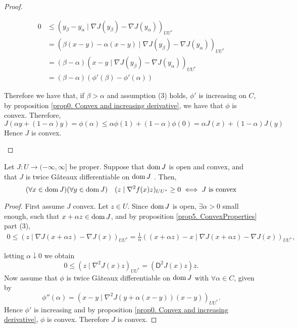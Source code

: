 \begin{proposition}
\begin{proof}
\begin{itemize}
		 \begin{align*}
		 0 &\leq (y_\beta - y_\alpha \mid \nabla J(y_\beta)-\nabla J(y_\alpha))_{UU^*}\\
		   &=(\beta (x-y) - \alpha(x-y) \mid \nabla J(y_\beta)-\nabla J(y_\alpha))_{UU^*} \\
	 	   &=(\beta-\alpha) (x-y \mid \nabla J(y_\beta)-\nabla J(y_\alpha))_{UU^*} \\
	 	   &= (\beta-\alpha) \left(\phi'(\beta)-\phi'(\alpha)\right)
		 \end{align*} 
		 
		 Therefore we have that, if $\beta > \alpha$ and assumption (3) holds, $\phi'$ is increasing on $C$, by proposition \eqref{prop0. Convex and increasing derivative}, we have that $\phi$ is convex. Therefore,
		 \[
		 J(\alpha y+(1-\alpha)y)=\phi(\alpha) \leq \alpha \phi(1)+(1-\alpha)\phi(0)=\alpha J(x) +(1-\alpha)J(y)
		 \]
		 Hence $J$ is convex.
		\end{itemize}
	 \end{proof}
\label{prop5. First derivative convex.}
\end{proposition}

\begin{theorem}
	\label{th5. Secon derivative convex.}
	 Let $J: U \rightarrow (-\infty, \infty]$ be proper. Suppose that $\mathrm{dom\,} J$
	 is open and convex, and that $J$ is twice G\^ateaux differentiable on $\mathrm{dom\,} J$ . Then,
	 \[
		 (\forall x \in \mathrm{dom\,} J )(\forall y \in \mathrm{dom\,} J ) \quad (z\mid  \nabla^2 f(x)z)_{UU^*} \geq 0 \iff J \text{ is convex}
	 \]
	 \begin{proof}
	 	First assume $J$ convex. Let $z \in U$. Since $\mathrm{dom\,} J$ is open, $\exists \alpha >0$ small enough, such that $x+\alpha z \in \mathrm{dom\,} J$, and by proposition \eqref{prop5. ConvexProperties} part (3), 
	 	\begin{align*}
	 		0 \leq	(z \mid \nabla J(x+\alpha z)-\nabla J(x))_{UU^*} = \frac{1}{\alpha} ((x+\alpha z) -x \mid \nabla J(x+\alpha z)-\nabla J(x))_{UU^*},
	 	\end{align*}
	 	
	 	letting $\alpha \downarrow 0$ we obtain
	 	\[
	 	0 \leq	(z \mid \nabla^2 J(x)z)_{UU^*} = (\mathsf{D}^2 J(x) z)z.
	 	\] 
	 	Now assume that $\phi$ is twice G\^ateaux differentiable on $\mathrm{dom\,} J$ with $\forall \alpha \in C$, given by
	 	\[
	 	 \phi''(\alpha) = (x-y \mid \nabla^2 J(y+\alpha(x-y))(x-y))_{UU^*}.
	 	\]
	 	Hence $\phi'$ is increasing and by proposition \eqref{prop0. Convex and increasing derivative}, $\phi$ is convex. Therefore $J$ is convex.
	 \end{proof}
\end{theorem}


